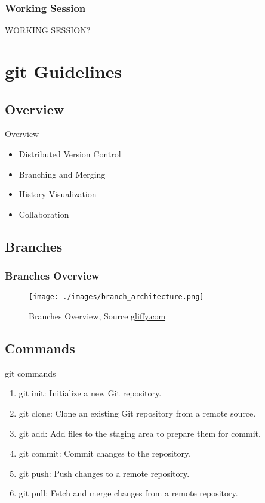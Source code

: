 \begin{frame}
    \frametitle{Working Session}
    \centering
    \Huge
    WORKING SESSION?
  \end{frame}
  
\section{git Guidelines}
\subsection{Overview}
\begin{frame}
    \begin{content}{Overview}
        \begin{itemize}
            \item Distributed Version Control
            \item Branching and Merging
            \item History Visualization
            \item Collaboration
        \end{itemize}
    \end{content}
\end{frame}
\subsection*{Branches}
\begin{frame}
    \frametitle{Branches Overview}
    \begin{figure}    
        \texttt{[image: ./images/branch\_architecture.png]}
        \caption{Branches Overview, Source \href{https://www.gliffy.com/blog/gitflow-diagrams}{gliffy.com}} 
    \end{figure}
\end{frame}
\subsection{Commands}
\begin{frame}
    \begin{content}{git commands}
        \begin{enumerate}
            \item git init: Initialize a new Git repository.
            \item git clone: Clone an existing Git repository from a remote source.
            \item git add: Add files to the staging area to prepare them for commit.
            \item git commit: Commit changes to the repository.
            \item git push: Push changes to a remote repository.
            \item git pull: Fetch and merge changes from a remote repository.
        \end{enumerate}
    \end{content}
\end{frame}

